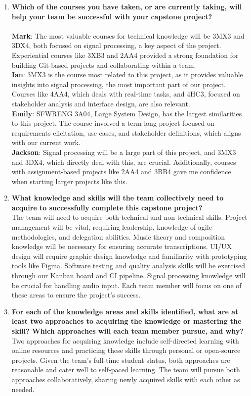 \documentclass{article}
\begin{document}
\begin{enumerate}
  \item \textbf{Which of the courses you have taken, or are currently taking, will help your team be successful with your capstone project?} \\ \\
  \textbf{Mark}: The most valuable courses for technical knowledge will be 3MX3 and 3DX4, both focused on signal processing, a key aspect of the project. Experiential courses like 3XB3 and 2AA4 provided a strong foundation for building Git-based projects and collaborating within a team. \\
  \textbf{Ian}: 3MX3 is the course most related to this project, as it provides valuable insights into signal processing, the most important part of our project. Courses like 4AA4, which deals with real-time tasks, and 4HC3, focused on stakeholder analysis and interface design, are also relevant. \\
  \textbf{Emily}: SFWRENG 3A04, Large System Design, has the largest similarities to this project. The course involved a term-long project focused on requirements elicitation, use cases, and stakeholder definitions, which aligns with our current work. \\
  \textbf{Jackson}: Signal processing will be a large part of this project, and 3MX3 and 3DX4, which directly deal with this, are crucial. Additionally, courses with assignment-based projects like 2AA4 and 3BB4 gave me confidence when starting larger projects like this. \\

  \item \textbf{What knowledge and skills will the team collectively need to acquire to successfully complete this capstone project?} \\
  The team will need to acquire both technical and non-technical skills. Project management will be vital, requiring leadership, knowledge of agile methodologies, and delegation abilities. Music theory and composition knowledge will be necessary for ensuring accurate transcriptions. UI/UX design will require graphic design knowledge and familiarity with prototyping tools like Figma. Software testing and quality analysis skills will be exercised through our Kanban board and CI pipeline. Signal processing knowledge will be crucial for handling audio input. Each team member will focus on one of these areas to ensure the project’s success. \\

  \item \textbf{For each of the knowledge areas and skills identified, what are at least two approaches to acquiring the knowledge or mastering the skill? Which approaches will each team member pursue, and why?} \\
  Two approaches for acquiring knowledge include self-directed learning with online resources and practicing these skills through personal or open-source projects. Given the team’s full-time student status, both approaches are reasonable and cater well to self-paced learning. The team will pursue both approaches collaboratively, sharing newly acquired skills with each other as needed.
\end{enumerate}
\end{document}
